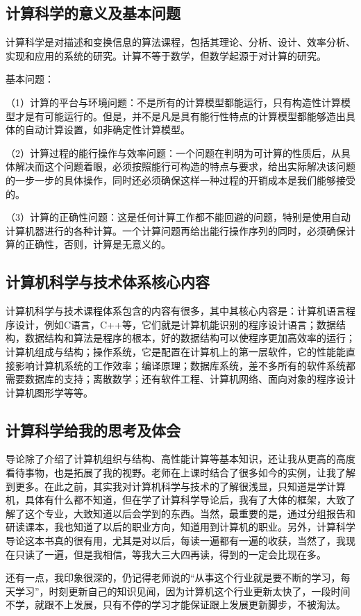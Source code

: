 \documentclass{article}
\begin{document}
\subsection{计算科学的意义及基本问题}
计算科学是对描述和变换信息的算法课程，包括其理论、分析、设计、效率分析、实现和应用的系统的研究。计算不等于数学，但数学起源于对计算的研究。\par
基本问题：\par
（1）计算的平台与环境问题：不是所有的计算模型都能运行，只有构造性计算模型才是有可能运行的。但是，并不是凡是具有能行性特点的计算模型都能够造出具体的自动计算设置，如非确定性计算模型。\par
（2）计算过程的能行操作与效率问题：一个问题在判明为可计算的性质后，从具体解决而这个问题着眼，必须按照能行可构造的特点与要求，给出实际解决该问题的一步一步的具体操作，同时还必须确保这样一种过程的开销成本是我们能够接受的。\par
（3）计算的正确性问题：这是任何计算工作都不能回避的问题，特别是使用自动计算机器进行的各种计算。一个计算问题再给出能行操作序列的同时，必须确保计算的正确性，否则，计算是无意义的。\par



\subsection{计算机科学与技术体系核心内容}
计算机科学与技术课程体系包含的内容有很多，其中其核心内容是：计算机语言程序设计，例如C语言，C++等，它们就是计算机能识别的程序设计语言；数据结构，数据结构和算法是程序的根本，好的数据结构可以使程序更加高效率的运行；计算机组成与结构；操作系统，它是配置在计算机上的第一层软件，它的性能能直接影响计算机系统的工作效率；编译原理；数据库系统，差不多所有的软件系统都需要数据库的支持；离散数学；还有软件工程、计算机网络、面向对象的程序设计计算机图形学等等。\par
\subsection{计算科学给我的思考及体会}
导论除了介绍了计算机组织与结构、高性能计算等基本知识，还让我从更高的高度看待事物，也是拓展了我的视野。老师在上课时结合了很多如今的实例，让我了解到更多。在此之前，其实我对计算机科学与技术的了解很浅显，只知道是学计算机，具体有什么都不知道，但在学了计算科学导论后，我有了大体的框架，大致了解了这个专业，大致知道以后会学到的东西。当然，最重要的是，通过分组报告和研读课本，我也知道了以后的职业方向，知道用到计算机的职业。另外，计算科学导论这本书真的很有用，尤其是对以后，每读一遍都有一遍的收获，当然了，我现在只读了一遍，但是我相信，等我大三大四再读，得到的一定会比现在多。\par
还有一点，我印象很深的，仍记得老师说的“从事这个行业就是要不断的学习，每天学习”，时刻更新自己的知识见闻，因为计算机这个行业更新太快了，一段时间不学，就跟不上发展，只有不停的学习才能保证跟上发展更新脚步，不被淘汰。\par
\end{document}
